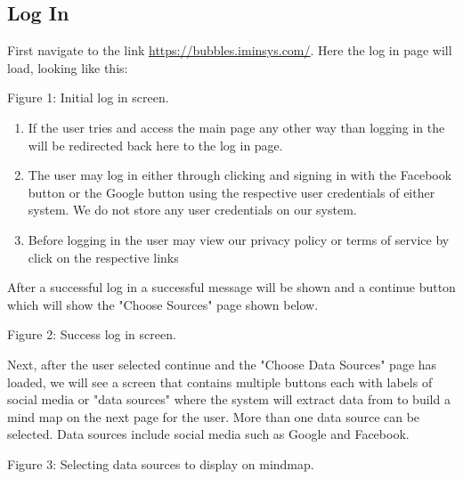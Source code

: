 \documentclass[hidelinks,english]{article}
\begin{document}
	   \subsection{Log In}

    	    First navigate to the link \url{https://bubbles.iminsys.com/}. Here the log in page will load, looking like this:
            \begin{center}
        	  \caption{Figure 1: Initial log in screen.}
        	  \label{Log In}
        	\end{center}
    	\begin{enumerate}  
            \item If the user tries and access the main page any other way than logging in the will be redirected back here to the log in page. 
            \item The user may log in either through clicking and signing in with the Facebook button or the Google button using the respective user credentials of either system. We do not store any user credentials on our system.
            \item Before logging in the user may view our privacy policy or terms of service by click on the respective links 
        \end{enumerate}
        
        After a successful log in a successful message will be shown and a continue button which will show the "Choose Sources" page shown below.
        \begin{center}
    	  \caption{Figure 2: Success log in screen.}
    	  \label{Log In Success}
    	\end{center}
    	
    	Next, after the user selected continue and the "Choose Data Sources" page has loaded, we will see a screen that contains multiple buttons each with labels of social media or "data sources" where the system will extract data from to build a mind map on the next page for the user. More than one data source can be selected. Data sources include social media such as Google and Facebook.
    	\begin{center}
    	  \caption{Figure 3: Selecting data sources to display on mindmap.}
    	  \label{Select Data}
    	\end{center}
\end{document}
